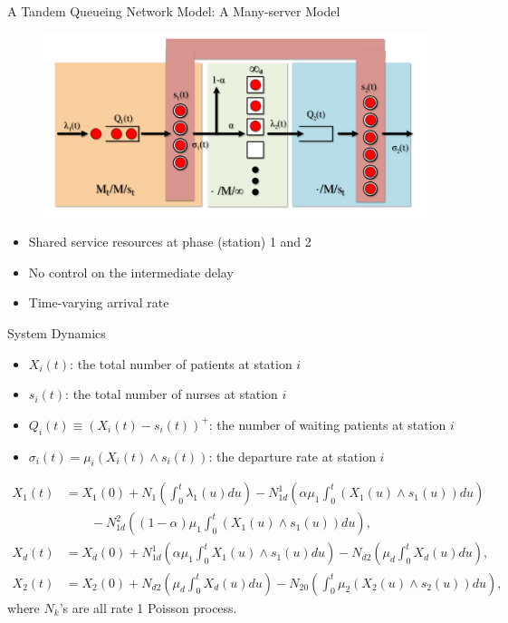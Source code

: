 \documentclass[smaller ,table,usenames,dvipsnames]{beamer}
\newcommand{\?}{\stackrel{?}{=}}
\begin{document}
\begin{frame}{A Tandem Queueing Network Model: A Many-server Model}
	\begin{figure}[h!]
	\centering
	\includegraphics[width=0.9\linewidth]{./Figures/multiserver_avi.pdf}
	\label{fig:multiserver}
    \end{figure}
\begin{itemize}
    \item Shared service resources at phase (station) 1 and 2
    \item No control on the intermediate delay
    \item Time-varying arrival rate
\end{itemize}
\end{frame}

\begin{frame}{System Dynamics}

\begin{itemize}
	\item $X_i(t)$: the total number of patients at station $i$
	\item $s_i(t)$: the total number of nurses at station $i$
	\item $Q_i(t) \equiv (X_i(t) - s_i(t))^+$: the number of waiting patients at station $i$
	\item $\sigma_i(t)=\mu_i({X}_i(t) \wedge {s}_i(t))$: the departure rate at station $i$
\end{itemize}


\footnotesize
\begin{align}
{X}_1(t) &= {X}_1(0)+{N}_1\left(\int_{0}^{t}\lambda_1(u)du \right)-  {N}_{1d}^1\left(\alpha\mu_1\int_{0}^{t}  \left( {X}_1(u) \wedge {s}_1(u) \right)  du \right) \nonumber\\
&\qquad - {N}^2_{1d}\left((1-\alpha)\mu_1\int_{0}^{t} \left( {X}_1(u) \wedge {s}_1(u) \right)  du \right),\label{ch3:key1}\\
{X}_d(t) &= {X}_d(0)+{N}^1_{1d}\left(\alpha\mu_1\int_{0}^t{X}_1(u) \wedge {s}_1(u)du \right) - {N}_{d2}\left(\mu_d\int_{0}^t {X}_d(u)du \right),\\
{X}_2(t)&={X}_2(0)+{N}_{d2}\left(\mu_d\int_{0}^t {X}_d(u)du \right)-{N}_{20}\left(\int_{0}^{t}\mu_2 \left( {X}_2(u) \wedge {s}_2(u) \right) du \right)\label{ch3:key2},
\end{align}
\normalsize
where $ N_k $'s are all rate 1 Poisson process.
\end{frame}
\end{document}
